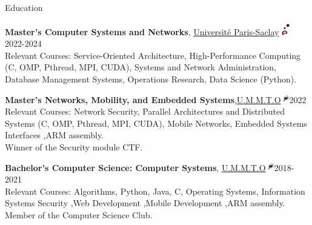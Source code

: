 \documentclass{resume}
\begin{document}
\begin{rSection}{Education}

{\large \bf Master's Computer Systems and Networks},  \href{https://www.universite-paris-saclay.fr/}{Université Paris-Saclay\includegraphics[height=1.5em]{../Ressource/petitlogo.png}} \hfill {2022-2024}\\
Relevant Courses: Service-Oriented Architecture, High-Performance Computing (C, OMP, Pthread, MPI, CUDA), Systems and Network Administration, Database Management Systems, Operations Research, Data Science (Python).

{\large \bf Master's Networks, Mobility, and Embedded Systems},\href{https://www.ummto.dz/}{U.M.M.T.O\includegraphics[height=1em]{../Ressource/ummto.png}}\hfill {2022}\\
Relevant Courses: Network Security, Parallel Architectures and Distributed Systems (C, OMP, Pthread, MPI, CUDA), Mobile Networks, Embedded Systems Interfaces ,ARM assembly.\\
Winner of the Security module CTF.

{\large \bf Bachelor's Computer Science: Computer Systems}, \href{https://www.ummto.dz/}{U.M.M.T.O\includegraphics[height=1em]{../Ressource/ummto.png}}\hfill {2018-2021}\\
Relevant Courses: Algorithms, Python, Java, C, Operating Systems, Information Systems Security ,Web Development ,Mobile Development ,ARM assembly.
Member of the Computer Science Club.
\end{rSection}
\vspace{-0.75em}

\end{document}
